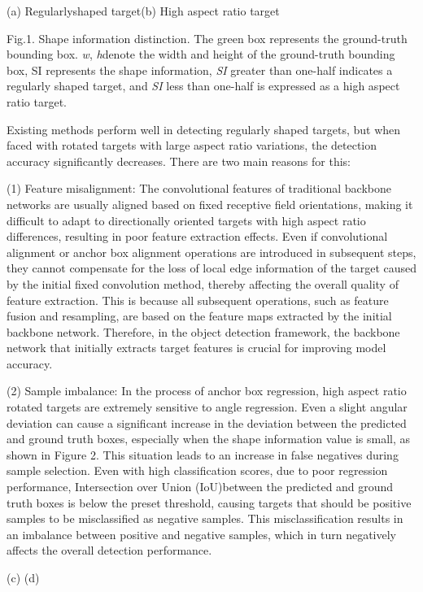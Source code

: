 \documentclass[journal]{IEEEtran}
\begin{document}
(a) Regularlyshaped target(b) High aspect ratio target

Fig.1. Shape information distinction. The green box represents the ground-truth bounding box. \textit{w}, \textit{h}denote the width and height of the ground-truth bounding box, SI represents the shape information, \textit{SI} greater than one-half indicates a regularly shaped target, and\textit{ SI} less than one-half is expressed as a high aspect ratio target.

Existing methods perform well in detecting regularly shaped targets, but when faced with rotated targets with large aspect ratio variations, the detection accuracy significantly decreases. There are two main reasons for this:

(1) Feature misalignment: The convolutional features of traditional backbone networks are usually aligned based on fixed receptive field orientations, making it difficult to adapt to directionally oriented targets with high aspect ratio differences, resulting in poor feature extraction effects. Even if convolutional alignment or anchor box alignment operations are introduced in subsequent steps, they cannot compensate for the loss of local edge information of the target caused by the initial fixed convolution method, thereby affecting the overall quality of feature extraction. This is because all subsequent operations, such as feature fusion and resampling, are based on the feature maps extracted by the initial backbone network. Therefore, in the object detection framework, the backbone network that initially extracts target features is crucial for improving model accuracy.

(2) Sample imbalance: In the process of anchor box regression, high aspect ratio rotated targets are extremely sensitive to angle regression. Even a slight angular deviation can cause a significant increase in the deviation between the predicted and ground truth boxes, especially when the shape information value is small, as shown in Figure 2. This situation leads to an increase in false negatives during sample selection. Even with high classification scores, due to poor regression performance, Intersection over Union (IoU)between the predicted and ground truth boxes is below the preset threshold, causing targets that should be positive samples to be misclassified as negative samples. This misclassification results in an imbalance between positive and negative samples, which in turn negatively affects the overall detection performance.

(c)                            (d)
\end{document}
